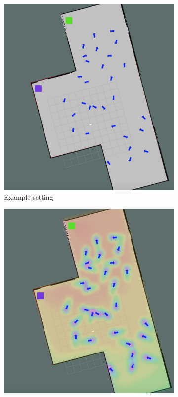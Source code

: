 \documentclass[a4paper,11pt]{report}
\begin{document}
	\begin{figure}[tbh]
	\centering
      \begin{subfigure}[b]{0.35\columnwidth}
    \includegraphics[scale = 0.15]{figures/no_cf.png}
    \caption{Example setting }
    \label{fig:exp_setting}
  \end{subfigure}
  \hspace{10mm}
  \begin{subfigure}[b]{0.35\columnwidth}
  \hspace{4mm}
    \includegraphics[scale = 0.15]{figures/cf.png}

\end{subfigure}
\end{figure}
\end{document}
